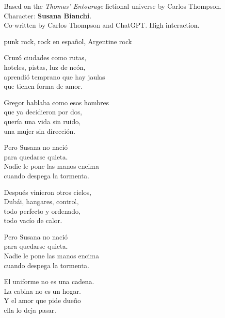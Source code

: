 

\begin{notes}
Based on the \emph{Thomas’ Entourage} fictional universe by Carlos Thompson.\\
Character: \textbf{Susana Bianchi}.\\
Co-written by Carlos Thompson and ChatGPT. %
High interaction.
\end{notes}

\begin{style}
punk rock, rock en español, Argentine rock 
\end{style}

\begin{lyrics}

Cruzó ciudades como rutas,\\
hoteles, pistas, luz de neón,\\
aprendió temprano que hay jaulas\\
que tienen forma de amor.

Gregor hablaba como esos hombres\\
que ya decidieron por dos,\\
quería una vida sin ruido,\\
una mujer sin dirección.

Pero Susana no nació\\
para quedarse quieta.\\
Nadie le pone las manos encima\\
cuando despega la tormenta.

Después vinieron otros cielos,\\
Dubái, hangares, control,\\
todo perfecto y ordenado,\\
todo vacío de calor.

Pero Susana no nació\\
para quedarse quieta.\\
Nadie le pone las manos encima\\
cuando despega la tormenta.

El uniforme no es una cadena.\\
La cabina no es un hogar.\\
Y el amor que pide dueño\\
ella lo deja pasar.


\end{lyrics}
